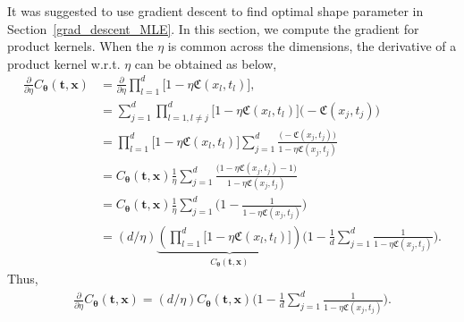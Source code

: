 \documentclass{iitthesis}          %
\newcommand{\bm}[1]{\boldsymbol{#1}}
\newcommand{\vtheta}{{\bm{\theta}}}
\newcommand{\vt}{\bm{t}}
\newcommand{\vx}{\bm{x}}
\newcommand\secref{Section~\ref}
\begin{document}
\label{sec:deriv_of_kernel}
It was suggested to use gradient descent to find optimal shape parameter in \secref{grad_descent_MLE}. In this section, we compute the gradient for product kernels. When the $\eta$ is common across the dimensions, the derivative of a product kernel  w.r.t. $\eta$ can be obtained as below,
\begin{align*}
\frac{\partial}{\partial \eta} C_\vtheta(\vt, \vx) 
& =
\frac{\partial}{\partial \eta} 
\prod_{l=1}^d \biggl[
1 - \eta \mathfrak{C}(x_l,t_l) \biggr], %
\\
& = 
\sum_{j=1}^d  
\prod_{l=1, l \neq j}^d \biggl[
1 - \eta \mathfrak{C}(x_l,t_l) \biggr]
\biggl( - \mathfrak{C}(x_j,t_j) \biggr)
\\
& =
\prod_{l=1}^d \biggl[
1 - \eta \mathfrak{C}(x_l,t_l) \biggr]
\sum_{j=1}^d 
\frac{
	\biggl( - \mathfrak{C}(x_j,t_j) \biggr)
}{
	1 - \eta \mathfrak{C}(x_j,t_j) 
}
\\
& =
C_\vtheta(\vt, \vx) 
\frac{1}{\eta}
\sum_{j=1}^d 
\frac{
	\biggl(1 - \eta \mathfrak{C}({x_j,t_j})  - 1 \biggr)
}{
	1 - \eta \mathfrak{C}(x_j,t_j) 
}
\\
& =
C_\vtheta(\vt, \vx) 
\frac{1}{\eta}
\sum_{j=1}^d 
\biggl(
1 - 
\frac{1
}{
	1 - \eta \mathfrak{C}(x_j,t_j) 
}
\biggr)
\\
& =
({d}/{\eta} )
\underbrace{
	\left(
	\prod_{l=1}^d \biggl[
	1 - \eta \mathfrak{C}(x_l,t_l) \biggr]
	\right) }_
{ C_\vtheta(\vt, \vx) }
\biggl(
1 - 
\frac{1}{d} \sum_{j=1}^d
\frac{1}
{ 1 - \eta \mathfrak{C}(x_j,t_j) }
\biggr)
.
\end{align*}
Thus,
\begin{align*}
\frac{\partial}{\partial \eta} C_\vtheta(\vt, \vx) = ({d}/{\eta} ) C_\vtheta(\vt, \vx) 
\biggl(
1 - 
\frac{1}{d} \sum_{j=1}^d
\frac{1}
{ 1 - \eta \mathfrak{C}(x_j,t_j) }
\biggr).
\end{align*}
\end{document}
